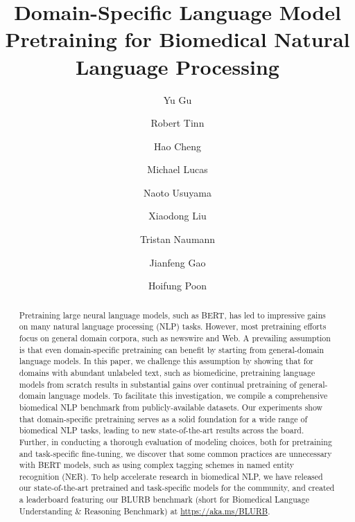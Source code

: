 \documentclass[acmlarge,screen,nonacm]{acmart}
\begin{document}
\title{Domain-Specific Language Model Pretraining for Biomedical Natural Language Processing}



\author{Yu Gu}
\authornotemark[1]

\author{Robert Tinn}

\author{Hao Cheng}
\authornotemark[1]

\author{Michael Lucas}

\author{Naoto Usuyama}

\author{Xiaodong Liu}

\author{Tristan Naumann}

\author{Jianfeng Gao}

\author{Hoifung Poon}



\renewcommand{\shortauthors}{Gu, Tinn, Cheng, et al.}

\newcommand{\eat}[1]{\ignorespaces}




\begin{abstract}

Pretraining large neural language models, such as BERT, has led to impressive gains on many natural language processing (NLP) tasks.
However, most pretraining efforts focus on general domain corpora, such as newswire and Web.
A prevailing assumption is that even domain-specific pretraining can benefit by starting from general-domain language models. 
In this paper, we challenge this assumption by showing that for domains with abundant unlabeled text, such as biomedicine, pretraining language models from scratch results in substantial gains over continual pretraining of general-domain language models.
To facilitate this investigation, we compile a comprehensive biomedical NLP benchmark from publicly-available datasets.
Our experiments show that domain-specific pretraining serves as a solid foundation for a wide range of biomedical NLP tasks, leading to new state-of-the-art results across the board.
Further, in conducting a thorough evaluation of modeling choices, both for pretraining and task-specific fine-tuning, we discover that some common practices are unnecessary with BERT models, such as using 
complex tagging schemes in named entity recognition (NER).
To help accelerate research in biomedical NLP, we have released our state-of-the-art pretrained and task-specific models for the community, and created a leaderboard featuring our BLURB benchmark (short for Biomedical Language Understanding \& Reasoning Benchmark) at \url{https://aka.ms/BLURB}.
\end{abstract}
\end{document}
